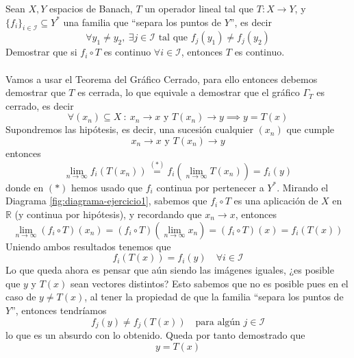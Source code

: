 \begin{ejercicio}
    Sean $X,Y$ espacios de Banach, $T$ un operador lineal tal que $T: X \longrightarrow Y$, y $\{f_i\}_{i \in \mathcal{I}} \subseteq Y^*$ una familia que ``separa los puntos de $Y$'', es decir
    \begin{equation*}
        \forall y_1 \neq y_2, \ \exists j \in \mathcal{I} \text{ tal que } f_j(y_1) \neq f_j(y_2)
    \end{equation*}
    Demostrar que si $f_i \circ T$ es continuo $\forall i \in \mathcal{I}$, entonces $T$ es continuo. \\ \\
    \noindent
    Vamos a usar el Teorema del Gráfico Cerrado, para ello entonces debemos demostrar que $T$ es cerrada, lo que equivale a demostrar que el gráfico $\Gamma_T$ es cerrado, es decir
    \begin{equation*}
        \forall (x_n) \subseteq X\ : \ x_n \longrightarrow x \text{ y } T(x_n) \longrightarrow y \implies y = T(x)
    \end{equation*}
    Supondremos las hipótesis, es decir, una sucesión cualquier $(x_n)$ que cumple
    \begin{equation*}
        x_n \longrightarrow x \text{ y } T(x_n) \longrightarrow y
    \end{equation*}
    entonces
    \begin{equation*}
        \lim_{n \to \infty} f_i(T(x_n)) \overset{(*)}{=} f_i\left(\lim_{n \to \infty} T(x_n)\right) = f_i(y)
    \end{equation*}
    donde en $(*)$ hemos usado que $f_i$ continua por pertenecer a $Y^*$. Mirando el Diagrama \ref{fig:diagrama-ejercicio1}, sabemos que $f_i \circ T$ es una aplicación de $X$ en $\mathbb{R}$ (y continua por hipótesis), y recordando que $x_n \longrightarrow x$, entonces
    $$\lim_{n \to \infty} (f_i \circ T)(x_n) = (f_i \circ T)(\lim_{n \to \infty} x_n) = (f_i\circ T)(x)=f_i(T(x))$$
    Uniendo ambos resultados tenemos que 
    \begin{equation*}
        f_i(T(x)) = f_i(y) \quad \forall i \in \mathcal{I}
    \end{equation*}
    Lo que queda ahora es pensar que aún siendo las imágenes iguales, ¿es posible que $y$ y $T(x)$ sean vectores distintos? Esto sabemos que no es posible pues en el caso de $y\neq T(x)$, al tener la propiedad de que la familia ``separa los puntos de $Y$'', entonces tendríamos 
    \begin{equation*}
        f_j(y) \neq f_j(T(x)) \quad \text{para algún } j \in \mathcal{I}
    \end{equation*}
    lo que es un absurdo con lo obtenido. Queda por tanto demostrado que
    \begin{equation*}
        y = T(x)
    \end{equation*}


\end{ejercicio}
